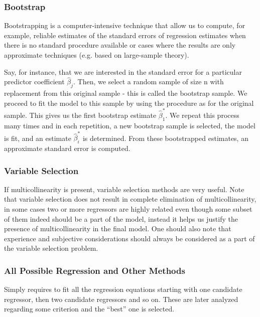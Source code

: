 \documentclass[11pt]{article}
\begin{document}
\subsubsection{Bootstrap}
\label{sec:orge4671d8}

Bootstrapping is a computer-intensive technique that allow us to compute, for example, reliable estimates 
of the standard errors of regression estimates when there is no standard procedure available or cases where 
the results are only approximate techniques (e.g. based on large-sample theory). 

Say, for instance, that we are interested in the standard error for a particular predictor coefficient \(\hat \beta_j\).
Then, we select a random sample of size n with replacement from this original sample - this
is called the bootstrap sample. We proceed to fit the model to this sample by using the procedure as for the original sample. This gives us
the first bootstrap estimate \(\hat \beta_1^*\). We repeat this process many times and in each repetition, a new 
bootstrap sample is selected, the model is fit, and an estimate \(\hat \beta^*_i\) is determined. From 
these bootstrapped estimates, an approximate standard error is computed.

\subsubsection{Variable Selection}
\label{sec:org0c8e83d}

If multicollinearity is present, variable selection methods are very useful. Note that variable selection does
not result in complete elimination of multicollinearity, in some cases two or more regressors are highly related 
even though some subset of them indeed should be a part of the model, instead it helps us justify the presence
of multicollinearity in the final model. One should also note that experience and subjective considerations
should always be considered as a part of the variable selection problem.

\subsubsection{All Possible Regression and Other Methods}
\label{sec:orgc98556d}

Simply requires to fit all the regression equations starting with one candidate regressor, then two
candidate regressors and so on. These are later analyzed regarding some criterion and the “best” one is selected. 
\end{document}
